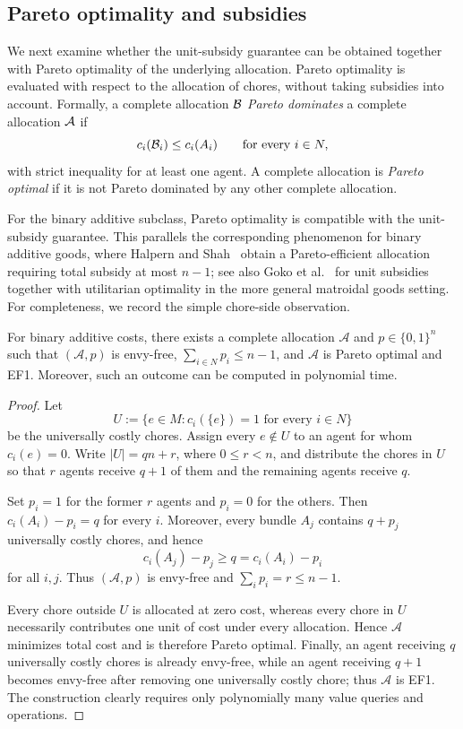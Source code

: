 \subsection{Pareto optimality and subsidies}

We next examine whether the unit-subsidy guarantee can be obtained together with Pareto optimality of the underlying allocation. Pareto optimality is evaluated with respect to the allocation of chores, without taking subsidies into account. Formally, a complete allocation $\mathcal{B}$ \emph{Pareto dominates} a complete allocation $\mathcal{A}$ if
\[
    c_i(\mathcal{B}_i)\leq c_i(A_{i})
    \qquad\text{for every }i\in N,
\]
with strict inequality for at least one agent. A complete allocation is \emph{Pareto optimal} if it is not Pareto dominated by any other complete allocation.

For the binary additive subclass, Pareto optimality is compatible with the unit-subsidy guarantee. This parallels the corresponding phenomenon for binary additive goods, where Halpern and Shah~\cite{HS19} obtain a Pareto-efficient allocation requiring total subsidy at most $n-1$; see also Goko et al.~\cite{goko2024fair} for unit subsidies together with utilitarian optimality in the more general matroidal goods setting. For completeness, we record the simple chore-side observation.

\begin{proposition}
\label{prop:additive-po}
For binary additive costs, there exists a complete allocation $\mathcal A$ and $p\in\{0,1\}^n$ such that $(\mathcal A,p)$ is envy-free, $\sum_{i\in N}p_i\le n-1$, and $\mathcal A$ is Pareto optimal and EF1. Moreover, such an outcome can be computed in polynomial time.
\end{proposition}

\begin{proof}
Let
\[
U:=\{e\in M:c_i(\{e\})=1\text{ for every }i\in N\}
\]
be the universally costly chores. Assign every $e\notin U$ to an agent for whom $c_i(e)=0$. Write $|U|=qn+r$, where $0\le r<n$, and distribute the chores in $U$ so that $r$ agents receive $q+1$ of them and the remaining agents receive $q$.

Set $p_i=1$ for the former $r$ agents and $p_i=0$ for the others. Then $c_i(A_i)-p_i=q$ for every $i$. Moreover, every bundle $A_j$ contains $q+p_j$ universally costly chores, and hence
\[
c_i(A_j)-p_j\ge q=c_i(A_i)-p_i
\]
for all $i,j$. Thus $(\mathcal A,p)$ is envy-free and $\sum_i p_i=r\le n-1$.

Every chore outside $U$ is allocated at zero cost, whereas every chore in $U$ necessarily contributes one unit of cost under every allocation. Hence $\mathcal A$ minimizes total cost and is therefore Pareto optimal. Finally, an agent receiving $q$ universally costly chores is already envy-free, while an agent receiving $q+1$ becomes envy-free after
removing one universally costly chore; thus $\mathcal A$ is EF1. The construction clearly requires only polynomially many value queries
and operations.
\end{proof}

